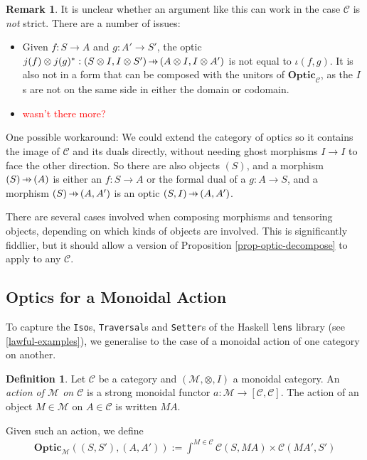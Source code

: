 \documentclass[11pt,a4paper]{article}
\theoremstyle{plain}
\theoremstyle{definition}
\newtheorem{definition}[theorem]{Definition}
\newtheorem{remark}[theorem]{Remark}
\newcommand{\C}{\mathscr{C}}
\newcommand{\M}{\mathscr{M}}
\newcommand{\Optic}{\mathbf{Optic}}
\newcommand{\hto}{\ensuremath{\,\mathaccent\shortmid\rightarrow\,}}
\newcommand{\todo}[1]{\textcolor{red}{\small #1}}
\begin{document}
\begin{remark}
It is unclear whether an argument like this can work in the case $\C$ is \emph{not} strict. There are a number of issues:

\begin{itemize}
\item Given $f : S \to A$ and $g : A' \to S'$, the optic $j(f) \otimes j(g)^* : (S \otimes I, I \otimes S') \hto (A \otimes I, I \otimes A')$ is not equal to $\iota(f, g)$. It is also not in a form that can be composed with the unitors of $\Optic_\C$, as the $I$s are not on the same side in either the domain or codomain.
\item \todo{wasn't there more?}
\end{itemize}

One possible workaround: We could extend the category of optics so it contains the image of $\C$ and its duals directly, without needing ghost morphisms $I \to I$ to face the other direction. So there are also objects $(S)$, and a morphism $(S) \hto (A)$ is either an $f : S \to A$ or the formal dual of a $g : A \to S$, and a morphism $(S) \hto (A, A')$ is an optic $(S, I) \hto (A, A')$. 

There are several cases involved when composing morphisms and tensoring objects, depending on which kinds of objects are involved. This is significantly fiddlier, but it should allow a version of Proposition \ref{prop-optic-decompose} to apply to any $\C$.
\end{remark}

\subsection{Optics for a Monoidal Action}

To capture the \texttt{Iso}s, \texttt{Traversal}s and \texttt{Setter}s of the Haskell \texttt{lens} library (see \ref{lawful-examples}), we generalise to the case of a monoidal action of one category on another.

\begin{definition}
Let $\C$ be a category and $(\M, \otimes, I)$ a monoidal category. An \emph{action of $\M$ on $\C$} is a strong monoidal functor $a : \M \to [\C, \C]$. The action of an object $M \in \M$ on $A \in \C$ is written $MA$.
\end{definition}

Given such an action, we define 
\begin{align*}
\Optic_\M((S, S'), (A, A')) := \int^{M \in \C} \C(S, MA) \times \C(MA', S')
\end{align*}
\end{document}
